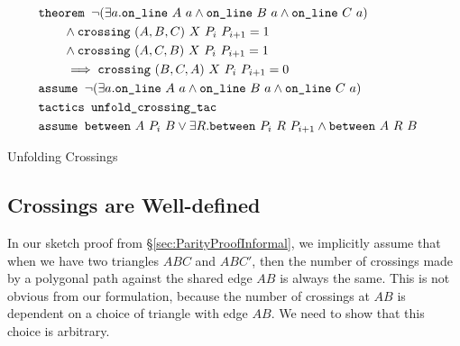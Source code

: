 \begin{boxedfigure}
\small
\begin{align*}
&\texttt{theorem } \neg(\exists a.\texttt{on\_line}\ A\ a\wedge \texttt{on\_line}\ B\ a\wedge \texttt{on\_line}\ C\ a) &\\
&\qquad\wedge \texttt{crossing}\ (A,B,C)\ X\ P_i\ P_{i+1} = 1&\\
&\qquad\wedge \texttt{crossing}\ (A,C,B)\ X\ P_i\ P_{i+1} = 1&\\
&\qquad\implies \texttt{crossing}\ (B,C,A)\ X\ P_i\ P_{i+1} = 0&\\
&\texttt{assume } \neg(\exists a.\texttt{on\_line}\ A\ a\wedge \texttt{on\_line}\ B\ a\wedge \texttt{on\_line}\ C\ a)&\\
&\texttt{tactics } \texttt{unfold\_crossing\_tac}&\\
&\texttt{assume } \texttt{between}\ A\ P_i\ B \vee \exists R. \texttt{between}\ P_i\ R\ P_{i+1} \wedge \texttt{between}\ A\ R\ B
\end{align*}
\caption{Unfolding Crossings}
\label{fig:UnfoldingCrossings}
\end{boxedfigure}




\subsection{Crossings are Well-defined}\label{sec:CrossingsWellDefined}
In our sketch proof from \S\ref{sec:ParityProofInformal}, we implicitly assume that when we have two triangles $ABC$ and $ABC'$, then the number of crossings made by a polygonal path against the shared edge $AB$ is always the same. This is not obvious from our formulation, because the number of crossings at $AB$ is dependent on a choice of triangle with edge $AB$. We need to show that this choice is arbitrary.

